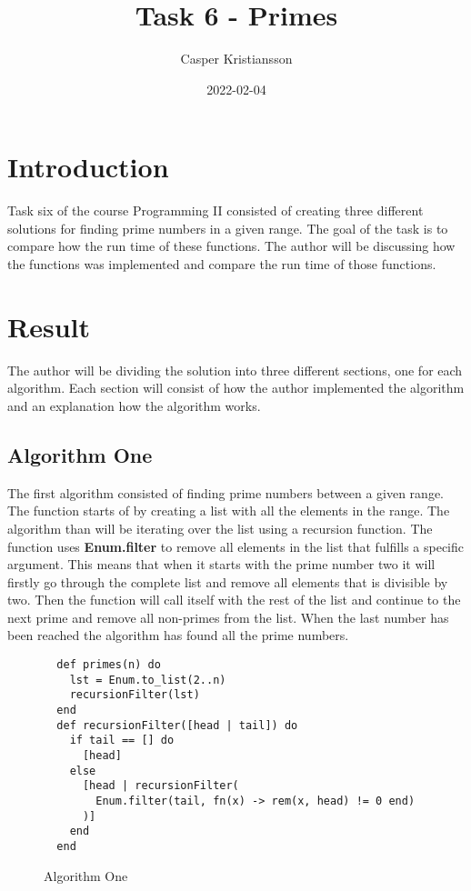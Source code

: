 \documentclass[a4paper,11pt]{article}
\begin{document}
\title{
    \textbf{Task 6 - Primes}
}
\author{Casper Kristiansson}
\date{2022-02-04}

\maketitle

\section*{Introduction}
Task six of the course Programming II consisted of creating three different solutions for finding prime numbers in a given range. The goal of the task is to compare how the run time of these functions. The author will be discussing how the functions was implemented and compare the run time of those functions.

\section*{Result}
The author will be dividing the solution into three different sections, one for each algorithm. Each section will consist of how the author implemented the algorithm and an explanation how the algorithm works.

\subsection*{Algorithm One}
The first algorithm consisted of finding prime numbers between a given range. The function starts of by creating a list with all the elements in the range. The algorithm than will be iterating over the list using a recursion function. The function uses \textbf{Enum.filter} to remove all elements in the list that fulfills a specific argument. This means that when it starts with the prime number two it will firstly go through the complete list and remove all elements that is divisible by two. Then the function will call itself with the rest of the list and continue to the next prime and remove all non-primes from the list. When the last number has been reached the algorithm has found all the prime numbers.

\begin{figure}[H]
\begin{verbatim}
  def primes(n) do
    lst = Enum.to_list(2..n)
    recursionFilter(lst)
  end
  def recursionFilter([head | tail]) do
    if tail == [] do
      [head]
    else
      [head | recursionFilter(
        Enum.filter(tail, fn(x) -> rem(x, head) != 0 end)
      )]
    end
  end
\end{verbatim}
\caption{Algorithm One}
\label{Figure:1}
\end{figure}
\end{document}
